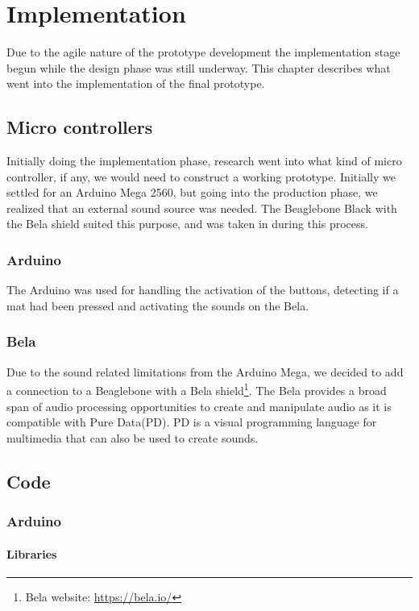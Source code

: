 \chapter{Implementation}%
Due to the agile nature of the prototype development the implementation stage begun while the design phase was still underway. This chapter describes what went into the implementation of the final prototype.

\section{Micro controllers}%
	Initially doing the implementation phase, research went into what kind of micro controller, if any, we would need to construct a working prototype. Initially we settled for an Arduino Mega 2560, but going into the production phase, we realized that an external sound source was needed. The Beaglebone Black with the Bela shield suited this purpose, and was taken in during this process.
	\subsection{Arduino}%
		The Arduino was used for handling the activation of the buttons, detecting if a mat had been pressed and activating the sounds on the Bela. 
		
	\subsection{Bela}%
		Due to the sound related limitations from the Arduino Mega, we decided to add a connection to a Beaglebone with a Bela shield\footnote{Bela website: \url{https://bela.io/}}. The Bela provides a broad span of audio processing opportunities to create and manipulate audio as it is compatible with Pure Data(PD). PD is a visual programming language for multimedia that can also be used to create sounds.
		
	
\section{Code}
	\subsection{Arduino}%
		\subsubsection{Libraries}%
